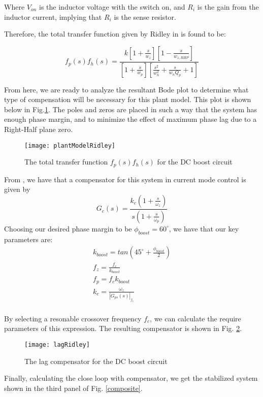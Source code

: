 Where $V_{on}$ is the inductor voltage with the switch on, and $R_i$ is the gain from the inductor current, implying that $R_i$ is the sense resistor.

Therefore, the total transfer function given by Ridley in \cite{ridley} is found to be:

\begin{equation}
\label{thirdOrder}
f_p(s)f_h(s)=\frac{k[1 + \frac{s}{w_z}][1 - \frac{s}{w_{z,RHP}}]}{[1 + \frac{s}{w_p}][\frac{s^2}{w_n^2} + \frac{s}{w_nQ_p} + 1]}
\end{equation}

From here, we are ready to analyze the resultant Bode plot to determine what type of compensation will be necessary for this plant model. This plot is shown below in Fig.\ref{plantModelRidley}.
The poles and zeros are placed in such a way that the system has enough phase margin, and to minimize the effect of maximum phase lag due to a Right-Half plane zero.

\begin{figure}[htbp]
\begin{center}
\texttt{[image: plantModelRidley]}
\caption{The total transfer function $f_p(s)f_h(s)$ for the DC boost circuit}
\label{plantModelRidley}
\end{center}
\end{figure}

From \cite{mohan}, we have that a compensator for this system in current mode control is given by
\begin{equation}
G_c(s) = \frac{k_c(1 + \frac{s}{\omega_z})}{s(1+\frac{s}{\omega_p})}
\end{equation}
Choosing our desired phase margin to be $\phi_{boost} = 60^{\circ}$, we have that our key parameters are:
\begin{gather*}
k_{boost} = tan(45^{\circ}+\frac{\phi_{boost}}{2})\\
f_z = \frac{f_c}{k_{boost}}\\
f_p = f_ck_{boost}\\
k_{c} = \frac{\omega_z}{|G_{ps}(s)|_{f_c}}\\
\end{gather*}

By selecting a resonable crossover frequency $f_c$, we can calculate the require parameters of this expression. The resulting compensator is shown in Fig. \ref{lagRidley}.
\begin{figure}[htbp]
\begin{center}
\texttt{[image: lagRidley]}
\caption{The lag compensator for the DC boost circuit}
\label{lagRidley}
\end{center}
\end{figure}
Finally, calculating the close loop with compensator, we get the stabilized system shown in the third panel of Fig. \ref{composite}. 


